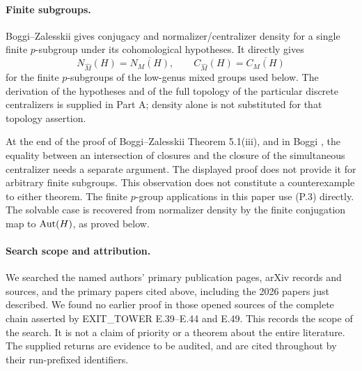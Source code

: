 \paragraph{Finite subgroups.}
Boggi--Zalesskii \cite[Theorem A, equivalently Theorem 4.3]{CA_BZ2025} gives conjugacy and normalizer/centralizer density for a single finite $p$-subgroup under its cohomological hypotheses. It directly gives
\[
 N_{\widehat M}(H)=\overline{N_M(H)},\qquad
 C_{\widehat M}(H)=\overline{C_M(H)}
 \tag{P.3}
\]
for the finite $p$-subgroups of the low-genus mixed groups used below. The derivation of the hypotheses and of the full topology of the particular discrete centralizers is supplied in Part A; density alone is not substituted for that topology assertion.

At the end of the proof of Boggi--Zalesskii Theorem 5.1(iii), and in Boggi \cite[Proposition 2.4]{CA_Boggi2026}, the equality between an intersection of closures and the closure of the simultaneous centralizer needs a separate argument. The displayed proof does not provide it for arbitrary finite subgroups. This observation does not constitute a counterexample to either theorem. The finite $p$-group applications in this paper use (P.3) directly. The solvable case is recovered from normalizer density by the finite conjugation map to $\operatorname{Aut}(H)$, as proved below.

\paragraph{Search scope and attribution.}
We searched the named authors' primary publication pages, arXiv records and sources, and the primary papers cited above, including the 2026 papers just described. We found no earlier proof in those opened sources of the complete chain asserted by EXIT\_TOWER E.39--E.44 and E.49. This records the scope of the search. It is not a claim of priority or a theorem about the entire literature. The supplied returns are evidence to be audited, and are cited throughout by their run-prefixed identifiers.
